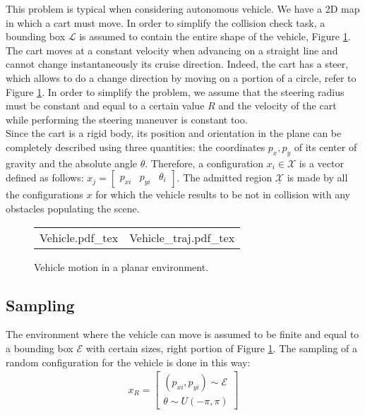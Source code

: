 This problem is typical when considering autonomous vehicle. We have a 2D map in which a cart must move. In order to simplify the collision check task, a bounding box $\mathcal{L}$ is assumed to contain the entire shape of the vehicle, Figure \ref{fig:vehicle}. The cart moves at a constant velocity when advancing on a straight line and cannot change instantaneously its cruise direction. Indeed, the cart has a steer, which allows to do a change direction by moving on a portion of a circle, refer to Figure \ref{fig:vehicle}. In order to simplify the problem, we assume that the steering radius must be constant and equal to a certain value $R$ and the velocity of the cart while performing the steering maneuver is constant too. 
\\
Since the cart is a rigid body, its position and orientation in the plane can be completely described using three quantities: the coordinates $p_x,p_y$ of its center of gravity and the absolute angle $\theta$. Therefore, a configuration $x_i \in \mathcal{X}$ is a vector defined as follows: $x_j = \begin{bmatrix} p_{xi} & p_{yi} & \theta _i  \end{bmatrix}$. The admitted region $\underline{\mathcal{X}}$  is made by all the configurations $x$ for which the vehicle results to be not in collision with any obstacles populating the scene.

 \begin{figure}
\begin{tabular}{cc}
\begin{minipage}[t]{0.49\textwidth}
	 \centering
 \def\svgwidth{0.85 \columnwidth}
 {Vehicle.pdf_tex} 
\end{minipage}
 & 
\begin{minipage}[t]{0.49\textwidth}
	 \centering
 \def\svgwidth{0.85 \columnwidth}
 {Vehicle_traj.pdf_tex} 
\end{minipage}
\end{tabular} 
	 \caption{Vehicle motion in a planar environment.}
 \label{fig:vehicle}
 \end{figure}
 
\subsection{Sampling}

The environment where the vehicle can move is assumed to be finite and equal to a bounding box $\mathcal{E}$ with certain sizes, right portion of Figure \ref{fig:vehicle}. The sampling of a random configuration for the vehicle is done in this way:
\begin{eqnarray}
x_R = \begin{bmatrix} (p_{xi} , p_{yi}) \sim \mathcal{E} \\ \theta \sim U(-\pi, \pi) \end{bmatrix}
\end{eqnarray}

